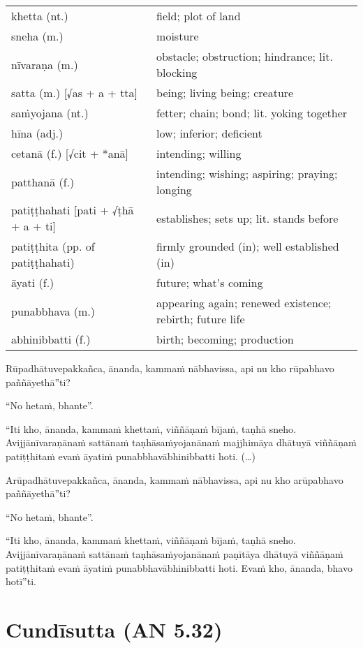 \documentclass[11pt,oneside]{memoir}
\begin{document}
\begin{longtable}{L{\colOne} L{\colTwo}}
khetta (nt.) & field; plot of land\\[0pt]
sneha (m.) & moisture\\[0pt]
nīvaraṇa (m.) & obstacle; obstruction; hindrance; lit. blocking\\[0pt]
satta (m.) [√as + a + tta] & being; living being; creature\\[0pt]
saṁyojana (nt.) & fetter; chain; bond; lit. yoking together\\[0pt]
hīna (adj.) & low; inferior; deficient\\[0pt]
cetanā (f.) [√cit + *anā] & intending; willing\\[0pt]
patthanā (f.) & intending; wishing; aspiring; praying; longing\\[0pt]
patiṭṭhahati [pati + √ṭhā + a + ti] & establishes; sets up; lit. stands before\\[0pt]
patiṭṭhita (pp. of patiṭṭhahati) & firmly grounded (in); well established (in)\\[0pt]
āyati (f.) & future; what's coming\\[0pt]
punabbhava (m.) & appearing again; renewed existence; rebirth; future life\\[0pt]
abhinibbatti (f.) & birth; becoming; production\\[0pt]
\end{longtable}

\begin{spacedquote}
Rūpadhātuvepakkañca, ānanda, kammaṁ nābhavissa, api nu kho rūpabhavo
paññāyethā”ti?

“No hetaṁ, bhante”.

“Iti kho, ānanda, kammaṁ khettaṁ, viññāṇaṁ bījaṁ, taṇhā sneho. Avijjānīvaraṇānaṁ
sattānaṁ taṇhāsaṁyojanānaṁ majjhimāya dhātuyā viññāṇaṁ patiṭṭhitaṁ evaṁ āyatiṁ
punabbhavābhinibbatti hoti. (…)

Arūpadhātuvepakkañca, ānanda, kammaṁ nābhavissa, api nu kho arūpabhavo
paññāyethā”ti?

“No hetaṁ, bhante”.

“Iti kho, ānanda, kammaṁ khettaṁ, viññāṇaṁ bījaṁ, taṇhā sneho. Avijjānīvaraṇānaṁ
sattānaṁ taṇhāsaṁyojanānaṁ paṇītāya dhātuyā viññāṇaṁ patiṭṭhitaṁ evaṁ āyatiṁ
punabbhavābhinibbatti hoti. Evaṁ kho, ānanda, bhavo hotī”ti.
\end{spacedquote}

\chapter{Cundīsutta (AN 5.32)}
\label{sec:orgcb10653}
\end{document}
